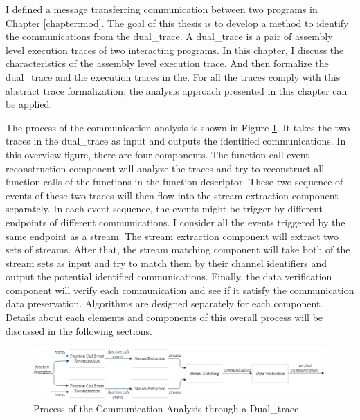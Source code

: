


\label{chapter:alo}
I defined a message transferring communication between two programs in Chapter \ref{chapter:mod}. The goal of this thesis is to develop a method to identify the communications from the dual\_trace. A dual\_trace is a pair of assembly level execution traces of two interacting programs. In this chapter, I discuss the characteristics of the assembly level execution trace. And then formalize the dual\_trace and the execution traces in the. For all the traces comply with this abstract trace formalization, the analysis approach presented in this chapter can be applied.

The process of the communication analysis is shown in Figure \ref{overview}. It takes the two traces in the dual\_trace as input and outputs the identified communications. In this overview figure, there are four components. The function call event reconstruction component will analyze the traces and try to reconstruct all function calls of the functions in the function descriptor. These two sequence of events of these two traces will then flow into the stream extraction component separately. In each event sequence, the events might be trigger by different endpoints of different communications. I consider all the events triggered by the same endpoint as a stream. The stream extraction component will extract two sets of streams. After that, the stream matching component will take both of the stream sets as input and try to match them by their channel identifiers and output the potential identified communications. Finally, the data verification component will verify each communication and see if it satisfy the communication data preservation. Algorithms are designed separately for each component. Details about each elements and components of this overall process will be discussed in the following sections.

\begin{figure}[H]
\centerline{\includegraphics[scale=0.55]{Figures/overview}}
\caption{Process of the Communication Analysis through a Dual\_trace}
\label{overview}
\end{figure}

